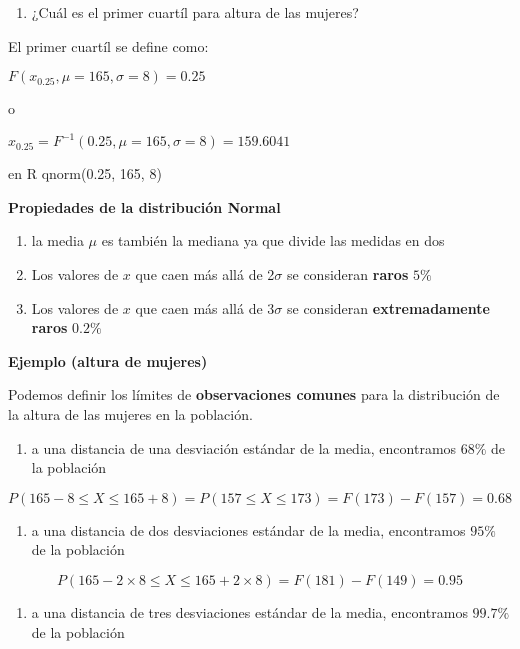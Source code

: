\documentclass[
]{book}
\providecommand{\tightlist}{%
  \setlength{\itemsep}{0pt}\setlength{\parskip}{0pt}}
\begin{document}
\begin{enumerate}
\def\labelenumi{\arabic{enumi})}
\setcounter{enumi}{2}
\tightlist
\item
  ¿Cuál es el primer cuartíl para altura de las mujeres?
\end{enumerate}

El primer cuartíl se define como:

\(F(x_{0.25}, \mu=165, \sigma=8)=0.25\)

o

\(x_{0.25}=F^{-1}(0.25, \mu=165, \sigma=8)=159.6041\)

en R qnorm(0.25, 165, 8)

\textbf{Propiedades de la distribución Normal}

\begin{enumerate}
\def\labelenumi{\arabic{enumi})}
\item
  la media \(\mu\) es también la mediana ya que divide las medidas en dos
\item
  Los valores de \(x\) que caen más allá de 2\(\sigma\) se consideran \textbf{raros} \(5\%\)
\item
  Los valores de \(x\) que caen más allá de 3\(\sigma\) se consideran \textbf{extremadamente raros} \(0.2\%\)
\end{enumerate}

\textbf{Ejemplo (altura de mujeres)}

Podemos definir los límites de \textbf{observaciones comunes} para la distribución de la altura de las mujeres en la población.

\begin{enumerate}
\def\labelenumi{\arabic{enumi})}
\tightlist
\item
  a una distancia de una desviación estándar de la media, encontramos \(68\%\) de la población
\end{enumerate}

\[P(165-8 \leq X \leq 165+8)=P(157 \leq X \leq 173)=F(173)-F(157)=0.68\]

\begin{enumerate}
\def\labelenumi{\arabic{enumi})}
\setcounter{enumi}{1}
\tightlist
\item
  a una distancia de dos desviaciones estándar de la media, encontramos \(95\%\) de la población
\end{enumerate}

\[P(165-2 \times 8 \leq X \leq 165+2\times 8)=F(181)-F(149)=0.95\]

\begin{enumerate}
\def\labelenumi{\arabic{enumi})}
\setcounter{enumi}{2}
\tightlist
\item
  a una distancia de tres desviaciones estándar de la media, encontramos \(99.7\%\) de la población
\end{enumerate}
\end{document}
